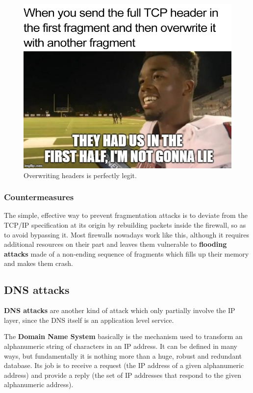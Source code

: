 \begin{figure}[h]
    \centering
    \includegraphics[scale=0.3]{img/tcp_halves_meme.png}
    \decoRule
    \caption{Overwriting headers is perfectly legit.}
    \label{fig:tcp_halves_meme}
\end{figure}


\subsubsection*{Countermeasures}
The simple, effective way to prevent fragmentation attacks is to deviate from the TCP/IP specification at its origin by rebuilding packets inside the firewall, so as to avoid bypassing it. Most firewalls nowadays work like this, although it requires additional resources on their part and leaves them vulnerable to \textbf{flooding attacks} made of a non-ending sequence of fragments which fills up their memory and makes them crash.
 

\subsection{DNS attacks}
\textbf{DNS attacks} are another kind of attack which only partially involve the IP layer, since the DNS itself is an application level service.

The \textbf{Domain Name System} basically is the mechanism used to transform an alphanumeric string of characters in an IP address. It can be defined in many ways, but fundamentally it is nothing more than a huge, robust and redundant database. Its job is to receive a request (the IP address of a given alphanumeric address) and provide a reply (the set of IP addresses that respond to the given alphanumeric address).
 
